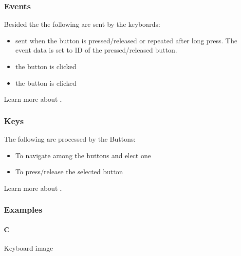 \documentclass[letterpaper,10pt,english]{sphinxmanual}
\begin{document}
\subsubsection{Events}
\label{\detokenize{object-types/kb:events}}
Besided the  the following  are sent by the keyboards:
\begin{itemize}
\item {} 
 sent when the button is pressed/released or repeated after long press. The event data is set to ID of the pressed/released button.

\item {} 
 the  button is clicked

\item {} 
 the  button is clicked

\end{itemize}

Learn more about {\hyperref[\detokenize{overview/events::doc}]{}}.


\subsubsection{Keys}
\label{\detokenize{object-types/kb:keys}}
The following  are processed by the Buttons:
\begin{itemize}
\item {} 
 To navigate among the buttons and elect one

\item {} 
 To press/release the selected button

\end{itemize}

Learn more about {\hyperref[\detokenize{overview/indev::doc}]{}}.


\subsubsection{Examples}
\label{\detokenize{object-types/kb:examples}}

\paragraph{C}
\label{\detokenize{object-types/kb:c}}
Keyboard image
\end{document}
